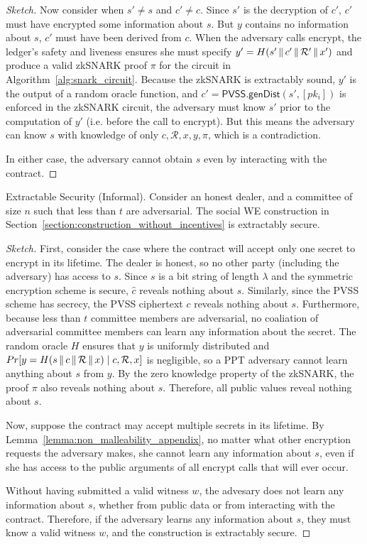 \begin{proof}[Sketch]
    Now consider when $s' \neq s$ and $c' \neq c$.
    Since $s'$ is the decryption of $c'$, $c'$ must have encrypted some information about $s$.
    But $y$ contains no information about $s$, $c'$ must have been derived from $c$.
    When the adversary calls \textsf{encrypt}, the ledger's safety and liveness ensures she must specify $y' = H(s' \,\|\, c' \,\|\, \mathcal{R}' \,\|\, x')$ and produce a valid zkSNARK proof $\pi$ for the circuit in Algorithm~\ref{alg:snark_circuit}.
    Because the zkSNARK is extractably sound, $y'$ is the output of a random oracle function, and $c' = \textsf{PVSS.genDist}(s', [pk_i])$ is enforced in the zkSNARK circuit,
    the adversary must know $s'$ prior to the computation of $y'$ (i.e. before the call to \textsf{encrypt}).
    But this means the adversary can know $s$ with knowledge of only $c, \mathcal{R}, x, y, \pi$, which is a contradiction.

    In either case, the adversary cannot obtain $s$ even by interacting with the contract.
\end{proof}
\begin{theorem}{Extractable Security (Informal).}\label{thm:security_hm_appendix}
    Consider an honest dealer, and a committee of size $n$ such that less than $t$ are adversarial.
    The social WE construction in Section~\ref{section:construction_without_incentives} is extractably secure.
\end{theorem}
\begin{proof}[Sketch]
    First, consider the case where the contract will accept only one secret to encrypt in its lifetime.
    The dealer is honest, so no other party (including the adversary) has access to $s$.
    Since $s$ is a bit string of length $\lambda$ and the symmetric encryption scheme is secure, $\hat{c}$ reveals nothing about $s$.
    Similarly, since the PVSS scheme has secrecy, the PVSS ciphertext $c$ reveals nothing about $s$.
    Furthermore, because less than $t$ committee members are adversarial, no coaliation of adversarial committee members can learn any information about the secret.
    The random oracle $H$ ensures that $y$ is uniformly distributed and $Pr[ y = H(s \,\|\, c \,\|\, \mathcal{R} \,\|\, x) \mid c, \mathcal{R}, x ]$ is negligible, so a PPT adversary cannot learn anything about $s$ from $y$.
    By the zero knowledge property of the zkSNARK, the proof $\pi$ also reveals nothing about $s$.
    Therefore, all public values reveal nothing about $s$.

    Now, suppose the contract may accept multiple secrets in its lifetime.
    By Lemma~\ref{lemma:non_malleability_appendix}, no matter what other encryption requests the adversary makes, she cannot learn any information about $s$, even if she has access to the public arguments of all \textsf{encrypt} calls that will ever occur.

    Without having submitted a valid witness $w$, the advesary does not learn any information about $s$, whether from public data or from interacting with the contract.
    Therefore, if the adversary learns any information about $s$, they must know a valid witness $w$, and the construction is extractably secure.
\end{proof}